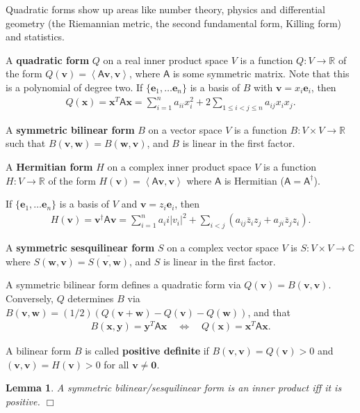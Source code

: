 \documentclass[letter-paper]{tufte-book}
\newtheorem{lemma}[theorem]{\color{pastel-blue}Lemma}
\newcommand{\inner}[2]{\left\langle #1, #2\right\rangle}
\newcommand{\As}{{\mathsf{A}}}
\newcommand{\Ob}{{\boldsymbol{0}}}
\newcommand{\eb}{{\boldsymbol{e}}}
\newcommand{\vb}{{\boldsymbol{v}}}
\newcommand{\wb}{{\boldsymbol{w}}}
\newcommand{\xb}{{\boldsymbol{x}}}
\newcommand{\yb}{{\boldsymbol{y}}}
\newcommand{\qedwhite}{\hfill \ensuremath{\Box}}
\begin{document}
Quadratic forms show up areas like number theory, physics and differential geometry (the Riemannian metric, the second fundamental form, Killing form) and statistics. 

A \textbf{quadratic form} $Q$ on a real inner product space $V$ is a function $Q : V \to \mathbb{R}$ of the form $Q(\vb) = \inner{\As\vb}{\vb}$, where $\As$ is some symmetric matrix. Note that this is a polynomial of degree two. If $\{\eb_1, \ldots \eb_n\}$ is a basis of $B$ with $\vb = x_i \eb_i$, then
\begin{align*}
  Q(\xb) = \xb^T \As \xb = \sum_{i=1}^n a_{ii} x_i^2 + 2 \sum_{1\leq i < j \leq n} a_{ij}x_i x_j.
\end{align*}

A \textbf{symmetric bilinear form} $B$ on a vector space $V$ is a function $B: V\times V \to \mathbb{R}$ such that $B(\vb, \wb) = B(\wb, \vb)$, and $B$ is linear in the first factor.

A \textbf{Hermitian form} $H$ on a complex inner product space $V$ is a function $H: V\to \mathbb{R}$ of the form $H(\vb) = \inner{\As\vb}{\vb}$ where $\As$ is Hermitian ($\As = \As^\dagger$).

If $\{\eb_1, \ldots \eb_n\}$ is a basis of $V$ and $\vb = z_i \eb_i$, then
\begin{align*}
  H(\vb) = \vb^\dagger \As \vb = \sum_{i=1}^n a_ii |v_i|^2 + \sum_{i<j} (a_{ij}\overline{z}_i z_j + a_{ji}\overline{z}_j z_i).
\end{align*}

A \textbf{symmetric sesquilinear form} $S$ on a complex vector space $V$ is $S: V\times V\to \mathbb{C}$ where $S(\wb,\vb) = \overline{S(\vb,\wb)}$, and $S$ is linear in the first factor.

A symmetric bilinear form defines a quadratic form via $Q(\vb) = B(\vb,\vb)$. Conversely, $Q$ determines $B$ via $B(\vb,\wb) = (1/2)(Q(\vb+\wb) - Q(\vb) - Q(\wb))$, and that
\begin{align*}
  B(\xb,\yb) = \yb^T \As \xb \quad \Leftrightarrow \quad Q(\xb) = \xb^T \As \xb.
\end{align*}

A bilinear form $B$ is called \textbf{positive definite} if $B(\vb,\vb) = Q(\vb) > 0$ and $(\vb,\vb) = H(\vb) > 0$ for all $\vb\neq\Ob$.

\begin{lemma}
  A symmetric bilinear/sesquilinear form is an inner product iff it is positive. \qedwhite
\end{lemma}
\end{document}
